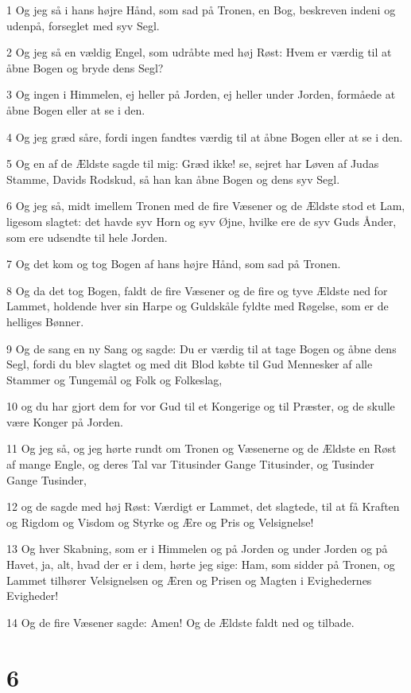 \par 1 Og jeg så i hans højre Hånd, som sad på Tronen, en Bog, beskreven indeni og udenpå, forseglet med syv Segl.
\par 2 Og jeg så en vældig Engel, som udråbte med høj Røst: Hvem er værdig til at åbne Bogen og bryde dens Segl?
\par 3 Og ingen i Himmelen, ej heller på Jorden, ej heller under Jorden, formåede at åbne Bogen eller at se i den.
\par 4 Og jeg græd såre, fordi ingen fandtes værdig til at åbne Bogen eller at se i den.
\par 5 Og en af de Ældste sagde til mig: Græd ikke! se, sejret har Løven af Judas Stamme, Davids Rodskud, så han kan åbne Bogen og dens syv Segl.
\par 6 Og jeg så, midt imellem Tronen med de fire Væsener og de Ældste stod et Lam, ligesom slagtet: det havde syv Horn og syv Øjne, hvilke ere de syv Guds Ånder, som ere udsendte til hele Jorden.
\par 7 Og det kom og tog Bogen af hans højre Hånd, som sad på Tronen.
\par 8 Og da det tog Bogen, faldt de fire Væsener og de fire og tyve Ældste ned for Lammet, holdende hver sin Harpe og Guldskåle fyldte med Røgelse, som er de helliges Bønner.
\par 9 Og de sang en ny Sang og sagde: Du er værdig til at tage Bogen og åbne dens Segl, fordi du blev slagtet og med dit Blod købte til Gud Mennesker af alle Stammer og Tungemål og Folk og Folkeslag,
\par 10 og du har gjort dem for vor Gud til et Kongerige og til Præster, og de skulle være Konger på Jorden.
\par 11 Og jeg så, og jeg hørte rundt om Tronen og Væsenerne og de Ældste en Røst af mange Engle, og deres Tal var Titusinder Gange Titusinder, og Tusinder Gange Tusinder,
\par 12 og de sagde med høj Røst: Værdigt er Lammet, det slagtede, til at få Kraften og Rigdom og Visdom og Styrke og Ære og Pris og Velsignelse!
\par 13 Og hver Skabning, som er i Himmelen og på Jorden og under Jorden og på Havet, ja, alt, hvad der er i dem, hørte jeg sige: Ham, som sidder på Tronen, og Lammet tilhører Velsignelsen og Æren og Prisen og Magten i Evighedernes Evigheder!
\par 14 Og de fire Væsener sagde: Amen! Og de Ældste faldt ned og tilbade.

\chapter{6}

